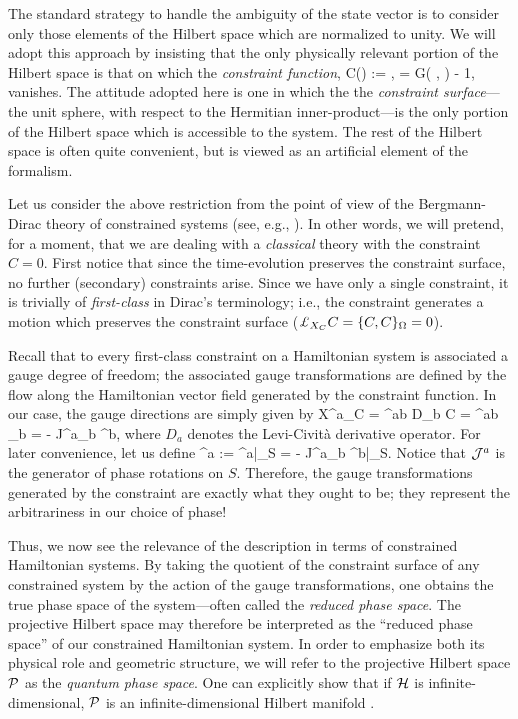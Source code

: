 The standard strategy to handle the ambiguity of the state vector is
to consider only those elements of the Hilbert space which are
normalized to unity. We will adopt this approach by insisting that the
only physically relevant portion of the Hilbert space is that on which
the {\em constraint function},
%
\be \label{constraint}
C(\Psi) := \< \Psi, \Psi {}
=  G( \Psi, \Psi ) - 1,
\ee
%
vanishes.  The attitude adopted here is one in which the the {\em
constraint surface}---the unit sphere, with respect to the Hermitian
inner-product---is the only portion of the Hilbert space which is
accessible to the system.  The rest of the Hilbert space is often
quite convenient, but is viewed as an artificial element of the
formalism.

Let us consider the above restriction from the point of view of the
Bergmann-Dirac theory of constrained systems (see, e.g.,
\cite{bd}). In other words, we will pretend, for a moment, that we are
dealing with a {\em classical} theory with the constraint $C=0$.  First
notice that since the time-evolution preserves the constraint surface,
no further (secondary) constraints arise.  Since we have only
a single constraint, it is trivially of {\em first-class} in Dirac's
terminology; i.e., the constraint generates a motion which preserves
the constraint surface ($\lie{\hvf{C}} C = \{ C, C\}_\W = 0$).

Recall that to every first-class constraint on a Hamiltonian system is
associated a gauge degree of freedom; the associated gauge
transformations are defined by the flow along the Hamiltonian vector
field generated by the constraint function.  In our case, the gauge
directions are simply given by
% 
\be X^a_{C} = \W^{ab} D_b C =
\W^{ab} \Psi_b
		  = -  J^a{}_b \Psi^b,
\ee
%
where $D_a$ denotes the Levi-Civit\`a derivative operator.  For later
convenience, let us define
%
\be
	\J^a := \hbar {}^a\big|_S = - J^a{}_b \Psi^b\big|_S.
\ee
%
Notice that $\J^a$ is the generator of phase rotations on $S$.
Therefore, the gauge transformations generated by the constraint are
exactly what they ought to be; they represent the arbitrariness in our
choice of phase!

Thus, we now see the relevance of the description in terms of
constrained Hamiltonian systems.  By taking the quotient of the
constraint surface of any constrained system by the action of the
gauge transformations, one obtains the true phase space of the
system---often called the {\em reduced phase space}.  The projective
Hilbert space may therefore be interpreted as the ``reduced phase
space'' of our constrained Hamiltonian system.  In order to emphasize
both its physical role and geometric structure, we will refer to the
projective Hilbert space $\P$ as the {\em quantum phase space}. One
can explicitly show that if $\H$ is infinite-dimensional, $\P$ is an
infinite-dimensional Hilbert manifold \cite{thesis}.

